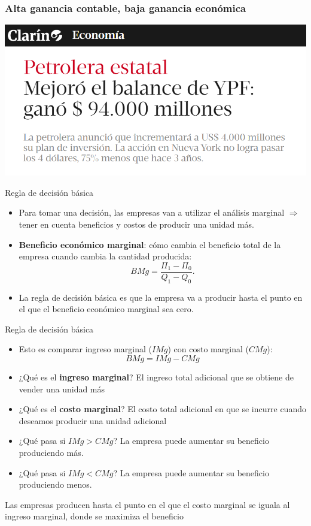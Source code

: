 \documentclass{beamer}
\begin{document}
\begin{frame}
\frametitle{Alta ganancia contable, baja ganancia económica}
\centering
\includegraphics[scale=0.6]{Slides Principios de Economia/YPF.png}
\end{frame}

\begin{frame}{Regla de decisión básica}
    \begin{itemize}
        \item Para tomar una decisión, las empresas van a utilizar el análisis marginal $\Rightarrow$ tener en cuenta beneficios y costos de producir una unidad más.
        \item \textbf{Beneficio económico marginal}: cómo cambia el beneficio total de la empresa cuando cambia la cantidad producida: \\
        \[
        BMg = \frac{\Pi_1 - \Pi_0}{Q_1 - Q_0}.
        \]
        \item La regla de decisión básica es que la empresa va a producir hasta el punto en el que el beneficio económico marginal sea cero.
    \end{itemize}
\end{frame}

\begin{frame}{Regla de decisión básica}
    \begin{itemize}
        \item Esto es comparar ingreso marginal ($IMg$) con costo marginal ($CMg$): 
        \[
        BMg = IMg - CMg
        \]
        \item ¿Qué es el \textbf{ingreso marginal}? El ingreso total adicional que se obtiene de vender una unidad más
        \item ¿Qué es el \textbf{costo marginal}? El costo total adicional en que se incurre cuando deseamos producir una unidad adicional
        \item ¿Qué pasa si $IMg > CMg$? La empresa puede aumentar su beneficio produciendo más.
        \item ¿Qué pasa si $IMg < CMg$? La empresa puede aumentar su beneficio produciendo menos.
    \end{itemize}
    \begin{boxB}
        \begin{center}
            Las empresas producen hasta el punto en el que el costo marginal se iguala al ingreso marginal, donde se maximiza el beneficio
        \end{center}
    \end{boxB}
\end{frame}
\end{document}
